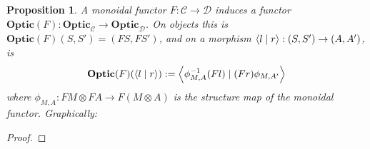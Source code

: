 \documentclass[11pt,letterpaper]{article}
\theoremstyle{plain}
\newtheorem{proposition}[theorem]{Proposition}
\theoremstyle{definition}
\newcommand{\C}{\mathscr{C}}
\newcommand{\D}{\mathscr{D}}
\newcommand{\Optic}{\mathbf{Optic}}
\newcommand{\rep}[2]{{\ensuremath \left\langle #1 \mid #2 \right\rangle}}
\begin{document}
\begin{proposition}\label{prop:change-of-action-monoidal}
  A monoidal functor $F : \C \to \D$ induces a functor $\Optic(F) : \Optic_\C \to \Optic_\D$. On objects this is $\Optic(F)(S, S') = (FS, FS')$, and on a morphism $\rep{l}{r} : (S, S') \to (A, A')$, is
  \begin{align*}
    \Optic(F)(\rep{l}{r}) := \rep{\phi^{-1}_{M,A} (Fl)}{(Fr) \phi_{M,A'}}
  \end{align*}
  where $\phi_{M,A} : FM \otimes FA \to F(M \otimes A)$ is the structure map of the monoidal functor. Graphically:
  \begin{center}
    
  \end{center}
\end{proposition}
\begin{proof}


\end{proof}
\end{document}
